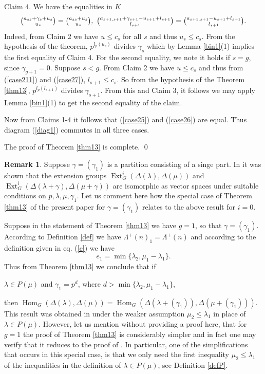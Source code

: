 \documentclass[11pt]{article}
\theoremstyle{definition}
\newtheorem{rema}[theo]{Remark}
\numberwithin{equation}{section}
\newcommand{\la}{\lambda}
\newcommand{\La}{\Lambda}
\DeclareMathOperator{\Hom}{Hom}
\DeclareMathOperator{\Ext}{Ext}
\numberwithin{equation}{section}
\begin{document}
 Claim 4. We have the equalities in $K$ 
 \begin{equation*}\label{eq115}\tbinom{a_{ss} + \gamma_s + u_s}{u_s}=\tbinom{a_{ss}  + u_s}{u_s}, \  \tbinom{a_{s+1,s+1}+\gamma_{s+1}-u_{s+1}+l_{s+1}}{l_{s+1}}=\tbinom{a_{s+1,s+1}-u_{s+1}+l_{s+1}}{l_{s+1}}.\end{equation*}
 Indeed, from Claim 2 we have  $u \le c_s$ for all $s$ and thus $u_s \le c_s$. From the hypothesis of the theorem, $p^{l_p(u_s)}$ divides $\gamma_s$ which by Lemma \ref{bin1}(1) implies the first equality of Claim 4. For the second equality, we note it holds if $s=g$, since $\gamma_{g+1}=0$. Suppose $s<g$. From Claim 2 we have  $u \le c_s$ and thus from (\ref{case211}) and (\ref{case27}), $l_{s+1} \le c_s$. So from the hypothesis of the Theorem \ref{thm13}, $p^{l_p(l_{s+1})}$ divides $\gamma_{s+1}$. From this and Claim 3, it follows we may apply Lemma \ref{bin1}(1) to get the second equality of the claim.
 
 Now from Claims 1-4 it follows that (\ref{case25}) and (\ref{case26}) are equal. Thus diagram (\ref{diag1}) commutes in all three cases.
 
 The proof of Theorem \ref{thm13} is complete. \qed

\begin{rema} Suppose $\gamma=(\gamma_1)$ is a partition consisting of a singe part. In \cite{MS4} it was shown that the extension groups $\Ext^i_G(\Delta(\lambda), \Delta(\mu))$ and $\Ext^i_G(\Delta(\lambda + \gamma), \Delta(\mu +\gamma))$ are isomorphic as vector spaces under suitable conditions on $p, \lambda, \mu, \gamma_1$. Let us comment here how the special case of Theorem \ref{thm13} of the present paper for $\gamma = (\gamma_1)$ relates to the above result for $i=0$. 
	
	Suppose in the statement of Theorem \ref{thm13} we have $g=1$, so that $\gamma=(\gamma_1)$. According to Definition \ref{def} we have $\La^+(n)_1=\La^+(n)$ and according to the definition given in eq. (\ref{e}) we have \[e_1 =\min\{\lambda_{2}, \mu_1-\lambda_1\}.\] Thus from Theorem \ref{thm13} we conclude that if \begin{center}
		$\lambda \in P(\mu)$ and $\gamma_1 =p^d$, where $d > \min\{\lambda_{2}, \mu_1-\lambda_1\}$,
	\end{center} then $\Hom_G(\Delta(\la),\Delta(\mu)) = \Hom_{G}(\Delta(\la+(\gamma_1)), \Delta(\mu+(\gamma_1)))$. This result was obtained in \cite[Theorem 6.1]{MS4} under the weaker assumption $\mu_2 \le \lambda_1$ in place of $\lambda \in P(\mu)$.  However, let us mention without providing a proof here, that for $g=1$ the proof of Theorem \ref{thm13} is considerably simpler and in fact one may verify that it reduces to the proof of \cite[Theorem 6.1]{MS4}. In particular, one of the simplifications that occurs in this special case, is that we only need the first inequality $\mu_2 \le  \la_1$ of the inequalities in the definition of $\la \in P(\mu)$, see Definition \ref{defP}.
	\end{rema}
	
\end{document}
